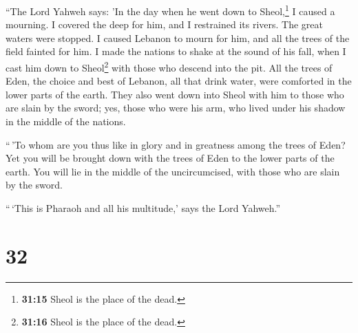  ``The Lord Yahweh says: 'In the day when he went down to
Sheol,\footnote{\textbf{31:15} Sheol is the place of the dead.} I caused
a mourning. I covered the deep for him, and I restrained its rivers. The
great waters were stopped. I caused Lebanon to mourn for him, and all
the trees of the field fainted for him.  I made the
nations to shake at the sound of his fall, when I cast him down to
Sheol\footnote{\textbf{31:16} Sheol is the place of the dead.} with
those who descend into the pit. All the trees of Eden, the choice and
best of Lebanon, all that drink water, were comforted in the lower parts
of the earth.  They also went down into Sheol with him to
those who are slain by the sword; yes, those who were his arm, who lived
under his shadow in the middle of the nations.

 ``\,'To whom are you thus like in glory and in greatness
among the trees of Eden? Yet you will be brought down with the trees of
Eden to the lower parts of the earth. You will lie in the middle of the
uncircumcised, with those who are slain by the sword.

``\,`This is Pharaoh and all his multitude,' says the Lord Yahweh.''

\hypertarget{section-30}{%
\section{32}\label{section-30}}

